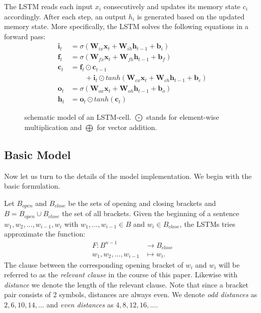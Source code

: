 \documentclass[11pt,a4paper]{article}
\begin{document}
The LSTM reads each input $x_i$ consecutively and updates its memory state $c_i$ accordingly. After each step, an output $h_i$ is generated based on the updated memory state. More specifically, the LSTM solves the following equations in a forward pass:
%
\begin{equation}
\begin{split}
    \mathbf{i}_t &= \sigma(\mathbf{W}_{ix}\mathbf{x}_t+\mathbf{W}_{ih}\mathbf{h}_{t-1}+\mathbf{b}_i) \\
    \mathbf{f}_t &= \sigma(\mathbf{W}_{fx}\mathbf{x}_t+\mathbf{W}_{fh}\mathbf{h}_{t-1}+\mathbf{b}_f) \\
    \mathbf{c}_t &= \mathbf{f}_t \odot \mathbf{c}_{t-1}\\
    & \qquad +\mathbf{i}_t \odot tanh(\mathbf{W}_{cx}\mathbf{x}_t + \mathbf{W}_{ch}\mathbf{h}_{t-1}+\mathbf{b}_c) \\
    \mathbf{o}_t &= \sigma(\mathbf{W}_{ox}\mathbf{x}_t + \mathbf{W}_{oh}\mathbf{h}_{t-1} + \mathbf{b}_o)\\
    \mathbf{h}_t &= \mathbf{o}_t \odot tanh(\mathbf{c}_t) 
    \label{eq:lstm_equations}
\end{split}
\end{equation}

\begin{figure}[h]
    \centering
    
    \caption{schematic model of an LSTM-cell. $\bigodot$ stands for element-wise multiplication and $\bigoplus$ for vector addition.}
    \label{fig:lstm_cell}

\end{figure}
%
\subsection{Basic Model}

Now let us turn to the details of the model implementation.  We begin with the basic formulation.

Let $B_{open}$ and $B_{close}$ be the sets of opening and closing brackets and $B = B_{open} \cup B_{close}$ the set of all brackets. Given the beginning of a sentence $w_1, w_2, ..., w_{i-1}, w_i$ with $w_1, ..., w_{i-1} \in B$ and $w_i \in B_{close}$, the LSTMs tries approximate the function:
%
\begin{align*}
  F \colon B^{n-1} &\to B_{close}\\
  w_1, w_2, ..., w_{i-1} &\mapsto w_i.
  \label{eq:brackets_task_definition}
\end{align*}
%
The clause between the corresponding opening bracket of $w_i$ and $w_i$ will be referred to as the \emph{relevant clause} in the course of this paper. Likewise with \emph{distance} we denote the length of the relevant clause. Note that since a bracket pair consists of 2 symbols, distances are always even. We denote \emph{odd distances} as ${2,6,10,14,...}$ and \emph{even distances} as ${4,8,12,16,...}$.
\end{document}
